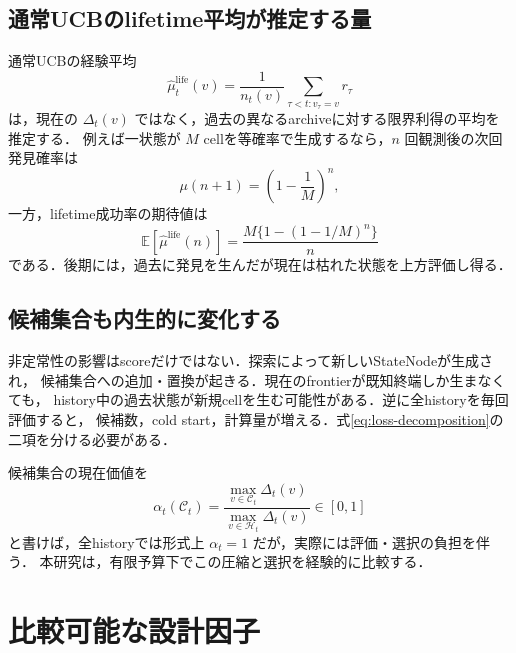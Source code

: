 \documentclass[a4paper,11pt]{ltjsarticle}
\newcommand{\history}{\mathcal H}
\begin{document}
\subsection{通常UCBのlifetime平均が推定する量}

通常UCBの経験平均
\begin{equation}
  \widehat\mu_t^{\mathrm{life}}(v)
  =\frac{1}{n_t(v)}
  \sum_{\tau<t:v_\tau=v}r_\tau
\end{equation}
は，現在の \(\Delta_t(v)\) ではなく，過去の異なるarchiveに対する限界利得の平均を推定する．
例えば一状態が \(M\) cellを等確率で生成するなら，\(n\) 回観測後の次回発見確率は
\begin{equation}
  \mu(n+1)=\left(1-\frac1M\right)^n,
\end{equation}
一方，lifetime成功率の期待値は
\begin{equation}
  \mathbb E[\widehat\mu^{\mathrm{life}}(n)]
  =\frac{M\{1-(1-1/M)^n\}}{n}
\end{equation}
である．後期には，過去に発見を生んだが現在は枯れた状態を上方評価し得る．

\subsection{候補集合も内生的に変化する}

非定常性の影響はscoreだけではない．探索によって新しいStateNodeが生成され，
候補集合への追加・置換が起きる．現在のfrontierが既知終端しか生まなくても，
history中の過去状態が新規cellを生む可能性がある．逆に全historyを毎回評価すると，
候補数，cold start，計算量が増える．式\eqref{eq:loss-decomposition}の二項を分ける必要がある．

候補集合の現在価値を
\begin{equation}
  \alpha_t(\mathcal C_t)
  =
  \frac{\max_{v\in\mathcal C_t}\Delta_t(v)}
       {\max_{v\in\history_t}\Delta_t(v)}
  \in[0,1]
\end{equation}
と書けば，全historyでは形式上 \(\alpha_t=1\) だが，実際には評価・選択の負担を伴う．
本研究は，有限予算下でこの圧縮と選択を経験的に比較する．

\section{比較可能な設計因子}
\label{sec:factors}
\end{document}
